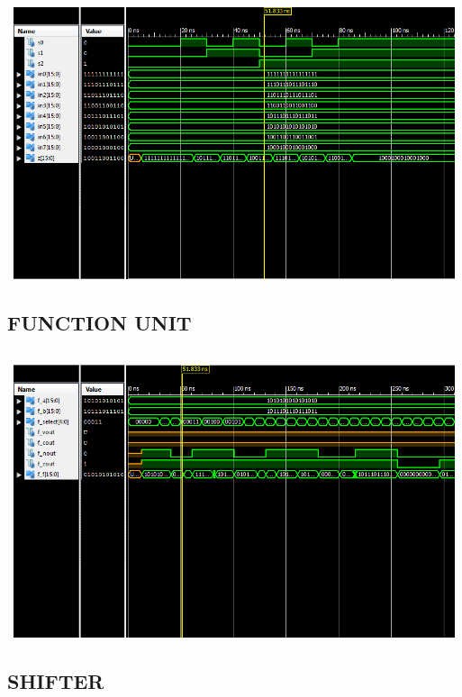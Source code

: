 \documentclass{article}
\begin{document}
\begin{lstlisting}

\end{lstlisting}
\includegraphics[width=16cm, height=8cm]{test_mux8.png}
\pagebreak


\subsection{FUNCTION UNIT}\label{sec:result}

\begin{lstlisting}

\end{lstlisting}
\includegraphics[width=16cm, height=8cm]{test_function_unit.png}
\pagebreak


\subsection{SHIFTER}\label{sec:result}
\end{document}

